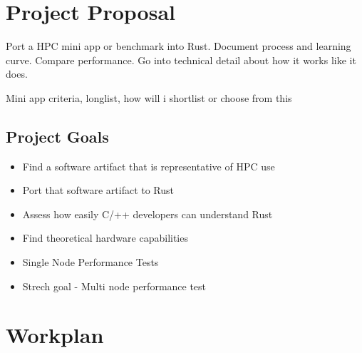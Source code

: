 \documentclass{report}
\begin{document}
\chapter{Project Proposal} %
Port a HPC mini app or benchmark into Rust. Document process and learning curve. Compare performance. Go into technical detail about how it works like it does.

Mini app criteria, longlist, how will i shortlist or choose from this
\section{Project Goals}
\begin{itemize}
  \item Find a software artifact that is representative of HPC use
  \item Port that software artifact to Rust
  \item Assess how easily C/++ developers can understand Rust
  \item Find theoretical hardware capabilities
  \item Single Node Performance Tests
  \item Strech goal - Multi node performance test
\end{itemize}
\chapter{Workplan} %
\end{document}
